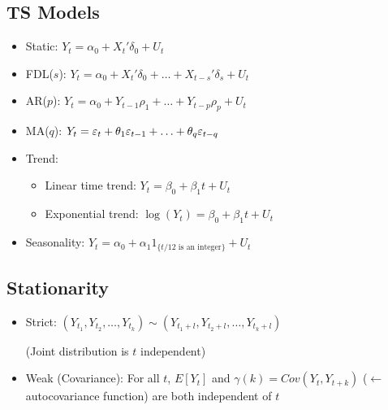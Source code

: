 \documentclass[10pt,landscape]{article}
\begin{document}
\begin{multicols}{3}
\subsection{TS Models}
\begin{itemize}
  \item Static: $Y_t = \alpha_0 + X_t' \delta_0 + U_t$
  \item FDL($s$): $Y_t = \alpha_0 + X_t' \delta_0 + \ldots + X_{t-s}' \delta_s + U_t$ 
  \item AR($p$): $Y_t = \alpha_0 + Y_{t-1}\rho_1 + \ldots + Y_{t-p}\rho_p + U_t$
  \item MA($q$): $Y_t = \varepsilon_t + \theta_1 \varepsilon_{t-1} + \ldots + \theta_q \varepsilon_{t-q}$
  \item Trend: 
    \begin{itemize}
      \item Linear time trend: $Y_t = \beta_0 + \beta_1 t + U_t$
      \item Exponential trend: $\log(Y_t) = \beta_0 + \beta_1 t + U_t$
    \end{itemize}
  \item Seasonality: $Y_t = \alpha_0 + \alpha_1 1_{\{t/12 \text{ is an integer}\}} + U_t$
\end{itemize}

\subsection{Stationarity}
\begin{itemize}
  \item Strict: $(Y_{t_1}, Y_{t_2}, \ldots, Y_{t_k}) \sim (Y_{t_1+l}, Y_{t_2+l}, \ldots, Y_{t_k+l})$
  
  \vspace{-1.5pt}
  (Joint distribution is $t$ independent)

  \item Weak (Covariance): For all $t$, $E[Y_t]$ and $\gamma(k) = Cov(Y_t, Y_{t+k})$ ($\leftarrow$ autocovariance function) are both independent of $t$
\end{itemize}

\end{multicols}
\end{document}
